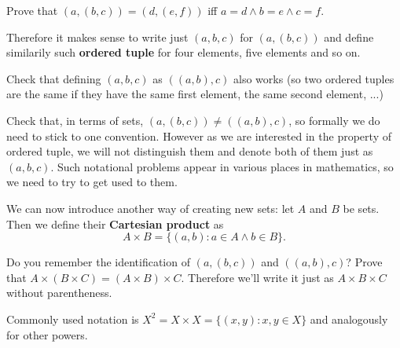 \begin{prob}
Prove that $(a,(b,c))=(d,(e,f))$ iff $a=d\wedge b=e\wedge c=f$.
\end{prob}
\noindent Therefore it makes sense to write just
$(a,b,c)$ for $(a,(b,c))$ and define similarily such \textbf{ordered tuple} for four elements, five elements
and so on.
\begin{prob}
Check that defining $(a,b,c)$ as $((a,b),c)$ also works (so two ordered tuples are the same if they have the
same first element, the same second element, ...)
\end{prob}
\begin{prob}
Check that, in terms of sets, $(a,(b,c))\neq ((a,b),c)$, so formally we do need to stick to one convention.
However as we are interested in the property of ordered tuple, we will not distinguish them and denote both
of them just as $(a,b,c)$. Such notational problems appear in various places in mathematics, so we need to
try to get used to them.
\end{prob}

\noindent We can now introduce another way of creating new sets: let $A$ and $B$ be sets. Then we define their
\textbf{Cartesian product} as
$$A\times B = \{(a,b) : a\in A\wedge b\in B\}.$$

\begin{prob}
	Do you remember the identification of $(a,(b,c))$ and $((a,b),c)$? Prove that
	$A\times (B\times C) = (A\times B)\times C$. Therefore we'll write it just as $A\times B\times C$
	without parentheness.
\end{prob}

\noindent Commonly used notation is $X^2 = X\times X = \{(x,y) : x, y \in X\}$ and analogously for other powers.
